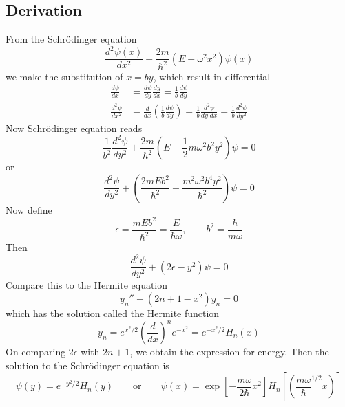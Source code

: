 \documentclass[../../../main.tex]{subfiles}
\begin{document}
\subsection{Derivation}
From the Schrödinger equation
\begin{equation*}
    \frac{d^{2}\psi(x)}{dx^{2}} + \frac{2m }{\hbar^2 }\left(E-\omega^{2}x^{2}\right)\psi(x)
\end{equation*}
we make the substitution of $x=by$, which result in differential
\begin{align*}
    \frac{d\psi }{dx}       & =\frac{d\psi }{dy}\frac{dy }{dx}=\frac{1 }{b }\frac{d\psi }{dy}                                                                       \\
    \frac{d^2 \psi }{dx^2 } & = \frac{d }{dx }\left( \frac{1 }{b }\frac{d\psi }{dy} \right) =\frac{1 }{b}\frac{d^2\psi }{dy\;dx}=\frac{1 }{b }\frac{d^2\psi }{dy^2}
\end{align*}
Now Schrödinger equation reads
\begin{equation*}
    \frac{1 }{b^2 }\frac{d^2\psi }{dy^2 }+\frac{2m }{\hbar^2 }\left( E-\frac{1 }{2 }m\omega^2b^2y^2   \right) \psi=0
\end{equation*}
or
\begin{equation*}
    \frac{d^2\psi }{dy^2 }+\left( \frac{2mEb^2 }{\hbar^2 }-\frac{m^2\omega^2b^4y^2 }{\hbar^2}   \right) \psi=0
\end{equation*}
Now define
\begin{equation*}
    \epsilon=\frac{mEb^2 }{\hbar^2}=\frac{E }{\hbar\omega},\qquad b^2=\frac{\hbar }{m\omega}
\end{equation*}
Then
\begin{equation*}
    \frac{d^2 \psi}{dy^2}+(2\epsilon-y^2)\psi=0
\end{equation*}
Compare this to the Hermite equation
\begin{equation*}
    y_n''+(2n+1-x^2)y_n=0
\end{equation*}
which has the solution called the Hermite function
\begin{equation*}
    y_n=e^{x^2/2}\left(\frac{d}{dx}\right)^ne^{-x^2}=e^{-x^2/2}H_n(x)
\end{equation*}
On comparing $2\epsilon$ with $2n+1$, we obtain the expression for energy.
Then the solution to the Schrödinger equation is
\begin{equation*}
    \psi(y)=e^{-y^2/2}H_n(y)\qquad\text{or}\qquad\psi(x)=\exp \left[ -\frac{m\omega }{2 \hbar}x^2 \right] H_n \left[ \left( \frac{m \omega }{\hbar }^{1/2}x \right)  \right]
\end{equation*}
\end{document}

